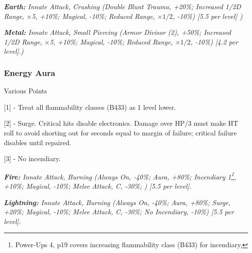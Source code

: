 \begin{multicols*}{3}
	\textcolor{OliveGreen}{\textit{\textbf{Earth:} Innate Attack, Crushing (Double Blunt Trauma, +20\%; Increased 1/2D Range, \(\times\)5, +10\%; Magical, -10\%; Reduced Range, \(\times1/2\), -10\%) [5.5 per level] ) }}
	
	\textcolor{OliveGreen}{\textit{\textbf{Metal:} Innate Attack, Small Piercing (Armor Divisor (2), +50\%; Increased 1/2D Range, \(\times\)5, +10\%; Magical, -10\%; Reduced Range, \(\times1/2\), -10\%) [4.2 per level].) }}
	
	
	\subsubsection{Energy Aura}\label{energy_aura}
	\begin{flushright}
		Various Points
	\end{flushright}
	
	\begin{center} 
		\begin{adjustwidth}{-0mm}{}
		\end{adjustwidth}
	\end{center}
	
	[1] - Treat all flammability classes (B433) as 1 level lower.
	
	[2] - Surge. Critical hits disable electronics. Damage over HP/3 must make HT roll to avoid shorting out for seconds equal to margin of failure; critical failure disables until repaired.
	
	[3] - No incendiary.
	
	\textcolor{OliveGreen}{\textit{\textbf{Fire:} Innate Attack, Burning (Always On, -40\%; Aura, +80\%; Incendiary 1\footnote{Power-Ups 4, p19 covers increasing flammability class (B433) for incendiary,}, +10\%; Magical, -10\%; Melee Attack, C, -30\%; ) [5.5 per level].}}
	
	\textcolor{OliveGreen}{\textit{\textbf{Lightning:} Innate Attack, Burning (Always On, -40\%; Aura, +80\%; Surge, +20\%; Magical, -10\%; Melee Attack, C, -30\%; No Incendiary, -10\%) [5.5 per level].}}
	

\end{multicols*}
